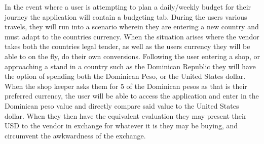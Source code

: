 \documentclass[12pt]{article}
\begin{document}
	In the event where a user is attempting to plan a daily/weekly budget for their journey the application will contain a budgeting tab.
	During the users various travels, they will run into a scenario wherein they are entering a new country and must adapt to the countries currency.
	When the situation arises where the vendor takes both the countries legal tender, as well as the users currency they will be able to on the fly, do their own conversions.
	Following the user entering a shop, or approaching a stand in a country such as the Dominican Republic they will have the option of spending both the Dominican	Peso, or the United States dollar.
	When the shop keeper asks them for 5 of the Dominican pesos as that is their preferred currency, the user will be able to access the application and enter in the Dominican peso value and directly compare said value to the United States dollar.
	When they then have the equivalent evaluation they may present their USD to the vendor in exchange for whatever it is they may be buying, and circumvent the awkwardness of the exchange.
\end{document}
